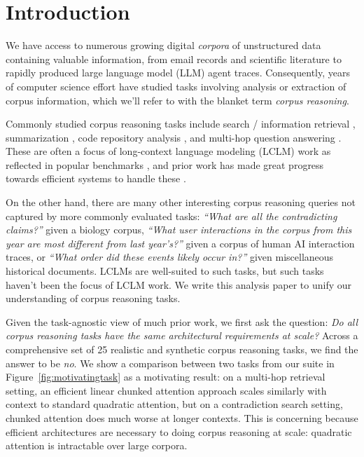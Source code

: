 \section{Introduction}


We have access to numerous growing digital \emph{corpora} of unstructured data containing valuable information, from email records and scientific literature to rapidly produced large language model (LLM) agent traces. Consequently, years of computer science effort have studied tasks involving analysis or extraction of corpus information, which we'll refer to with the blanket term \emph{corpus reasoning}. 

Commonly studied corpus reasoning tasks include search / information retrieval \citep{TREC2021, Hou2025CLERCAD}, summarization \citep{Kocisk2017TheNR}, code repository analysis \citep{Bai2024LongBenchVT}, and multi-hop question answering \citep{Yang2018HotpotQAAD}. These are often a focus of long-context language modeling (LCLM) work as reflected in popular benchmarks \cite{Yen2024HELMETHT, Bai2024LongBenchVT, Chen2026LongBenchPA}, and prior work has made great progress towards efficient systems to handle these \cite{Beltagy2020LongformerTL} . 

On the other hand, there are many other interesting corpus reasoning queries not captured by more commonly evaluated tasks: \emph{``What are all the contradicting claims?''} given a biology corpus, \emph{``What user interactions in the corpus from this year are most different from last year's?''} given a corpus of human AI interaction traces, or \emph{``What order did these events likely occur in?''} given miscellaneous historical documents. LCLMs are well-suited to such tasks, but such tasks haven't been the focus of LCLM work. We write this analysis paper to unify our understanding of corpus reasoning tasks.

Given the task-agnostic view of much prior work, we first ask the question: \emph{Do all corpus reasoning tasks have the same architectural requirements at scale?}  Across a comprehensive set of 25 realistic and synthetic corpus reasoning tasks, we find the answer to be \emph{no}. We show a comparison between two tasks from our suite in Figure~\ref{fig:motivatingtask} as a motivating result: on a multi-hop retrieval setting, an efficient linear chunked attention approach scales similarly with context to standard quadratic attention, but on a contradiction search setting, chunked attention does much worse at longer contexts. This is concerning because efficient architectures are necessary to doing corpus reasoning at scale: quadratic attention is intractable over large corpora.

